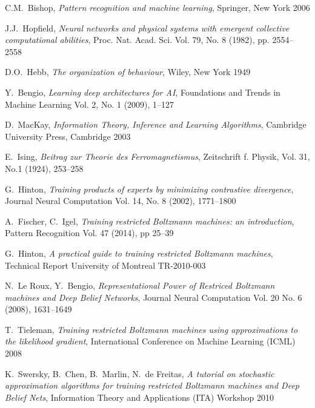 \documentclass[a4paper, draft]{article}
\theoremstyle{own}
\theoremstyle{remark}
\begin{document}

\begin{thebibliography}{9}
	

C.M.~Bishop, 
{\em Pattern recognition and machine learning},
Springer, New York 2006

J.J.~Hopfield,
{\em Neural networks and physical systems with emergent collective computational
	abilities},
Proc. Nat. Acad. Sci. Vol. 79, No. 8 (1982), pp. 2554--2558

D.O.~Hebb,
{\em The organization of behaviour},
Wiley, New York 1949

Y.~Bengio,
{\em Learning deep architectures for AI},
Foundations and Trends in Machine Learning Vol. 2, No. 1 (2009), 1--127

D.~MacKay,
{\em Information Theory, Inference and Learning Algorithms},
Cambridge University Press, Cambridge 2003

E.~Ising,
{\em Beitrag zur Theorie des Ferromagnetismus},
Zeitschrift f. Physik, Vol. 31, No.1 (1924), 253--258

G.~Hinton,
{\em Training products of experts by minimizing contrastive divergence},
Journal Neural Computation Vol. 14, No. 8 (2002), 1771--1800

A.~Fischer, C.~Igel,
{\em Training restricted Boltzmann machines: an introduction},
Pattern Recognition Vol. 47 (2014), pp 25--39

G.~Hinton,
{\em A practical guide to training restricted Boltzmann machines},
Technical Report University of Montreal TR-2010-003

N.~Le Roux, Y.~Bengio,
{\em Representational Power of Restriced Boltzmann machines and Deep Belief Networks},
Journal Neural Computation Vol. 20 No. 6 (2008), 1631--1649

T.~Tieleman, 
{\em Training restricted Boltzmann machines using approximations to the likelihood gradient},
International Conference on Machine Learning (ICML) 2008

K.~Swersky, B.~Chen, B.~Marlin, N.~de Freitas,
{\em A tutorial on stochastic approximation algorithms for training restricted Boltzmann machines and Deep Belief Nets},
Information Theory and Applications (ITA) Workshop 2010


\end{thebibliography}
\end{document}
